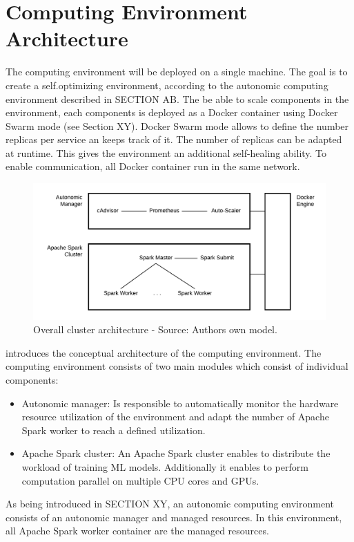 \section{Computing Environment Architecture}
The computing environment will be deployed on a single machine.
The goal is to create a self.optimizing environment, according to the autonomic computing environment described in SECTION AB.
The be able to scale components in the environment, each components is deployed as a Docker container using Docker Swarm mode (see Section XY). Docker Swarm mode allows to define the number replicas per service an keeps track of it. The number of replicas can be adapted at runtime. This gives the environment an additional self-healing ability.
To enable communication, all Docker container run in the same network.

\begin{figure}[h]
\centering
\includegraphics[scale=0.8]{images/05_conceptual_design/cluster_architecture/overall_architecture}
\caption{Overall cluster architecture - Source: Authors own model.}
\label{fig:05_environment_concept}
\end{figure}
 introduces the conceptual architecture of the computing environment.
The computing environment consists of two main modules which consist of individual components:
\begin{itemize}
\item Autonomic manager: Is responsible to automatically monitor the hardware resource utilization of the environment and adapt the number of Apache Spark worker to reach a defined utilization.
\item Apache Spark cluster: An Apache Spark cluster enables to distribute the workload of training ML models. Additionally it enables to perform computation parallel on multiple CPU cores and GPUs.
\end{itemize}
As being introduced in SECTION XY, an autonomic computing environment consists of an autonomic manager and managed resources.
In this environment, all Apache Spark worker container are the managed resources.


